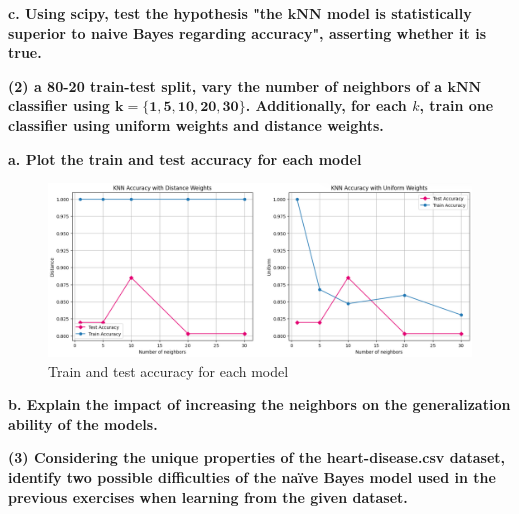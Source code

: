 \documentclass[12pt]{article}
\begin{document}
\vspace{20pt}
\textbf{c. Using scipy, test the hypothesis "the $\mathbf{kNN}$ model is statistically superior to naive Bayes regarding accuracy", asserting whether it is true.}

\vspace{20pt}
\textbf{(2) a 80-20 train-test split, vary the number of neighbors of a $\mathbf{kNN}$ classifier using $\mathbf{k=\{1, 5, 10, 20, 30\}}$. Additionally, for each $k$, train one classifier using uniform weights and distance weights.}

\vspace{10pt}
\textbf{a. Plot the train and test accuracy for each model}

\vspace{20pt}


\begin{figure}[H]
    \centering
      \includegraphics[width=12cm]{./Part II/2_a.png}
      \caption{Train and test accuracy for each model}
\end{figure}

\vspace{20pt}
\textbf{b. Explain the impact of increasing the neighbors on the generalization ability of the models.}

\vspace{20pt}
\textbf{(3) Considering the unique properties of the heart-disease.csv dataset, identify two
possible diﬃculties of the naïve Bayes model used in the previous exercises when learning
from the given dataset.}
\end{document}
